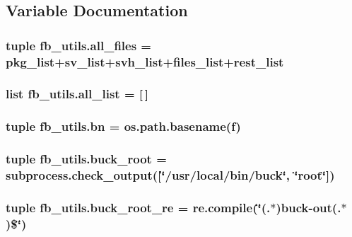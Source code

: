 \subsection{Variable Documentation}
\hypertarget{namespacefb__utils_ad793aa0bb99875a76c0169394ef87e87}{
\subsubsection[{all\-\_\-files}]{\setlength{\rightskip}{0pt plus 5cm}tuple fb\-\_\-utils.\-all\-\_\-files = {\bf pkg\-\_\-list}+{\bf sv\-\_\-list}+{\bf svh\-\_\-list}+{\bf files\-\_\-list}+{\bf rest\-\_\-list}}}\label{namespacefb__utils_ad793aa0bb99875a76c0169394ef87e87}
\hypertarget{namespacefb__utils_aca12fc82e453152f81a1819957a5bdbd}{
\subsubsection[{all\-\_\-list}]{\setlength{\rightskip}{0pt plus 5cm}list fb\-\_\-utils.\-all\-\_\-list = \mbox{[}$\,$\mbox{]}}}\label{namespacefb__utils_aca12fc82e453152f81a1819957a5bdbd}
\hypertarget{namespacefb__utils_a7eac21abed8b5bb8ebd3450cb70c8a80}{
\subsubsection[{bn}]{\setlength{\rightskip}{0pt plus 5cm}tuple fb\-\_\-utils.\-bn = os.\-path.\-basename({\bf f})}}\label{namespacefb__utils_a7eac21abed8b5bb8ebd3450cb70c8a80}
\hypertarget{namespacefb__utils_ae7dbeeac0d9d06d0c8412bc84bd91eed}{
\subsubsection[{buck\-\_\-root}]{\setlength{\rightskip}{0pt plus 5cm}tuple fb\-\_\-utils.\-buck\-\_\-root = subprocess.\-check\-\_\-output(\mbox{[}\char`\"{}/usr/local/bin/buck\char`\"{}, \char`\"{}root\char`\"{}\mbox{]})}}\label{namespacefb__utils_ae7dbeeac0d9d06d0c8412bc84bd91eed}
\hypertarget{namespacefb__utils_aa82478ef5cba8a32c2c7b1354312ae94}{
\subsubsection[{buck\-\_\-root\-\_\-re}]{\setlength{\rightskip}{0pt plus 5cm}tuple fb\-\_\-utils.\-buck\-\_\-root\-\_\-re = re.\-compile(\char`\"{}(.$\ast$)buck-\/out(.$\ast$)\$\char`\"{})}}\label{namespacefb__utils_aa82478ef5cba8a32c2c7b1354312ae94}
